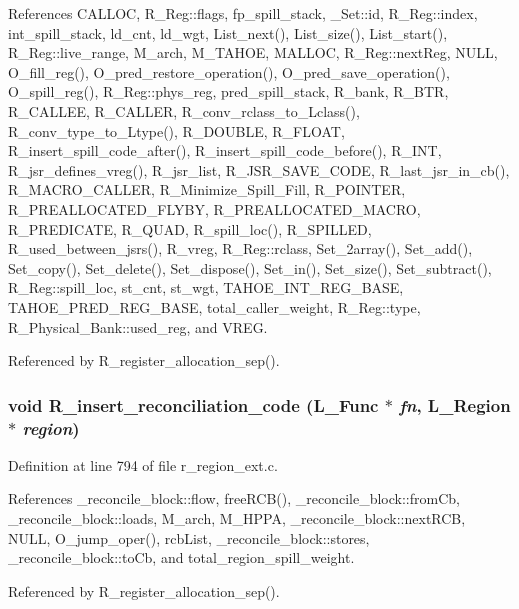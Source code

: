 References CALLOC, R\_\-Reg::flags, fp\_\-spill\_\-stack, \_\-Set::id, R\_\-Reg::index, int\_\-spill\_\-stack, ld\_\-cnt, ld\_\-wgt, List\_\-next(), List\_\-size(), List\_\-start(), R\_\-Reg::live\_\-range, M\_\-arch, M\_\-TAHOE, MALLOC, R\_\-Reg::next\-Reg, NULL, O\_\-fill\_\-reg(), O\_\-pred\_\-restore\_\-operation(), O\_\-pred\_\-save\_\-operation(), O\_\-spill\_\-reg(), R\_\-Reg::phys\_\-reg, pred\_\-spill\_\-stack, R\_\-bank, R\_\-BTR, R\_\-CALLEE, R\_\-CALLER, R\_\-conv\_\-rclass\_\-to\_\-Lclass(), R\_\-conv\_\-type\_\-to\_\-Ltype(), R\_\-DOUBLE, R\_\-FLOAT, R\_\-insert\_\-spill\_\-code\_\-after(), R\_\-insert\_\-spill\_\-code\_\-before(), R\_\-INT, R\_\-jsr\_\-defines\_\-vreg(), R\_\-jsr\_\-list, R\_\-JSR\_\-SAVE\_\-CODE, R\_\-last\_\-jsr\_\-in\_\-cb(), R\_\-MACRO\_\-CALLER, R\_\-Minimize\_\-Spill\_\-Fill, R\_\-POINTER, R\_\-PREALLOCATED\_\-FLYBY, R\_\-PREALLOCATED\_\-MACRO, R\_\-PREDICATE, R\_\-QUAD, R\_\-spill\_\-loc(), R\_\-SPILLED, R\_\-used\_\-between\_\-jsrs(), R\_\-vreg, R\_\-Reg::rclass, Set\_\-2array(), Set\_\-add(), Set\_\-copy(), Set\_\-delete(), Set\_\-dispose(), Set\_\-in(), Set\_\-size(), Set\_\-subtract(), R\_\-Reg::spill\_\-loc, st\_\-cnt, st\_\-wgt, TAHOE\_\-INT\_\-REG\_\-BASE, TAHOE\_\-PRED\_\-REG\_\-BASE, total\_\-caller\_\-weight, R\_\-Reg::type, R\_\-Physical\_\-Bank::used\_\-reg, and VREG.

Referenced by R\_\-register\_\-allocation\_\-sep().
\subsubsection{\setlength{\rightskip}{0pt plus 5cm}void R\_\-insert\_\-reconciliation\_\-code (L\_\-Func $\ast$ {\em fn}, L\_\-Region $\ast$ {\em region})}\label{r__regproto_8h_4a556d724e13a9ce25cb9421e5ef1cf7}




Definition at line 794 of file r\_\-region\_\-ext.c.

References \_\-reconcile\_\-block::flow, free\-RCB(), \_\-reconcile\_\-block::from\-Cb, \_\-reconcile\_\-block::loads, M\_\-arch, M\_\-HPPA, \_\-reconcile\_\-block::next\-RCB, NULL, O\_\-jump\_\-oper(), rcb\-List, \_\-reconcile\_\-block::stores, \_\-reconcile\_\-block::to\-Cb, and total\_\-region\_\-spill\_\-weight.

Referenced by R\_\-register\_\-allocation\_\-sep().

